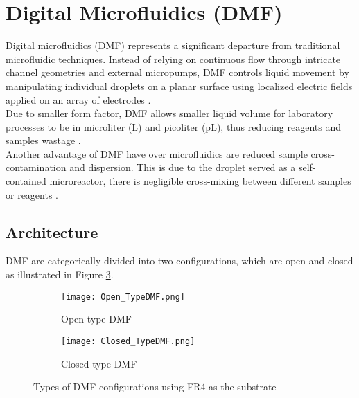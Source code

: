 \section{Digital Microfluidics (DMF)}
Digital microfluidics (DMF) represents a significant departure from traditional microfluidic techniques. Instead of relying on continuous flow through intricate channel geometries and external micropumps, DMF controls liquid movement by manipulating individual droplets on a planar surface using localized electric fields applied on an array of electrodes \cite{abdelgawadDigitalRevolutionNew2009,fairChemicalBiologicalApplications2007}.\\

Due to smaller form factor, DMF allows smaller liquid volume for laboratory processes to be in microliter (\textmugreek L) and picoliter (pL), thus reducing reagents and samples wastage \cite{bhattacharjeeDropletPositionControl2010,royNewSamplePreparation2015}.\\

Another advantage of DMF have over microfluidics are reduced sample cross-contamination and dispersion. This is due to the droplet served as a self-contained microreactor, there is negligible cross-mixing between different samples or reagents \cite{luoMachineVisionbasedDriving2021,wuResearchProgressElectrode2023}.\newpage

\subsection{Architecture}
DMF are categorically divided into two configurations, which are open and closed as illustrated in Figure \ref{DMFConfig}.\\
\begin{figure}[h!]
    \centering
    \begin{subfigure}{0.45\textwidth}
        \centering
        \texttt{[image: Open\_TypeDMF.png]}
        \caption{Open type DMF}
        \label{OpenTypeDMF}
    \end{subfigure}
    \begin{subfigure}{0.45\textwidth}
        \centering
        \texttt{[image: Closed\_TypeDMF.png]}
        \caption{Closed type DMF}
        \label{ClosedTypeDMF}
    \end{subfigure}
    \caption{Types of DMF configurations using FR4 as the substrate}
    \label{DMFConfig}
\end{figure}

